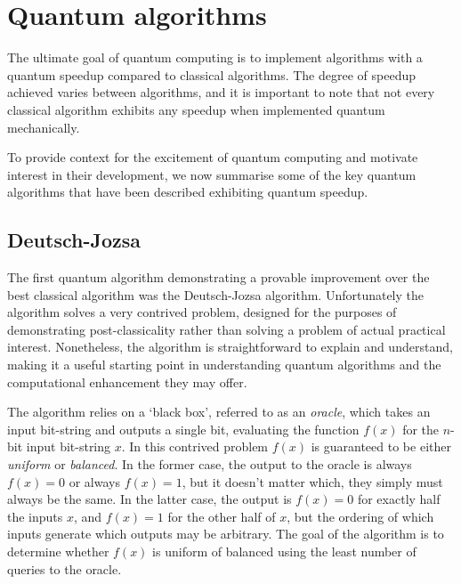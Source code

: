 %
%

\section{Quantum algorithms} \label{sec:quantum_algs}

The ultimate goal of quantum computing is to implement algorithms with a quantum speedup compared to classical algorithms. The degree of speedup achieved varies between algorithms, and it is important to note that not every classical algorithm exhibits any speedup when implemented quantum mechanically.

To provide context for the excitement of quantum computing and motivate interest in their development, we now summarise some of the key quantum algorithms that have been described exhibiting quantum speedup.

%
%

\subsection{Deutsch-Jozsa} 

The first quantum algorithm demonstrating a provable improvement over the best classical algorithm was the Deutsch-Jozsa algorithm\cite{bib:DeutschJozsa92}. Unfortunately the algorithm solves a very contrived problem, designed for the purposes of demonstrating post-classicality rather than solving a problem of actual practical interest. Nonetheless, the algorithm is straightforward to explain and understand, making it a useful starting point in understanding quantum algorithms and the computational enhancement they may offer.

The algorithm relies on a `black box', referred to as an \textit{oracle}, which takes an input bit-string and outputs a single bit, evaluating the function $f(x)$ for the $n$-bit input bit-string $x$. In this contrived problem $f(x)$ is guaranteed to be either \textit{uniform} or \textit{balanced}. In the former case, the output to the oracle is always \mbox{$f(x)=0$} or always \mbox{$f(x)=1$}, but it doesn't matter which, they simply must always be the same. In the latter case, the output is \mbox{$f(x)=0$} for exactly half the inputs $x$, and \mbox{$f(x)=1$} for the other half of $x$, but the ordering of which inputs generate which outputs may be arbitrary. The goal of the algorithm is to determine whether $f(x)$ is uniform of balanced using the least number of queries to the oracle.


